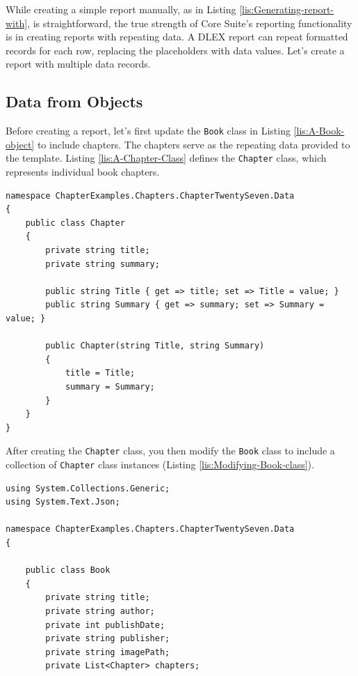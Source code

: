 \documentclass[american,letterpaper]{tufte-book}
\numberwithin{equation}{section}
\numberwithin{figure}{section}
\begin{document}
{{While creating a simple report manually, as in Listing \ref{lis:Generating-report-with},
is straightforward, the true strength of Core Suite's reporting functionality
is in creating reports with repeating data. A DLEX report can repeat
formatted records for each row, replacing the placeholders with data
values. Let's create a report with multiple data records.

\subsection{Data from Objects}

Before creating a report, let's first update the \texttt{Book} class
in Listing \ref{lis:A-Book-object} to include chapters. The chapters
serve as the repeating data provided to the template. Listing \ref{lis:A-Chapter-Class}
defines the \texttt{Chapter} class, which represents individual book
chapters.

\bgroup{}
\begin{lstlisting}[caption={A Chapter Class used with Book class.},label={lis:A-Chapter-Class},basicstyle={\small\ttfamily},breaklines=true]
namespace ChapterExamples.Chapters.ChapterTwentySeven.Data
{
    public class Chapter
    {
        private string title;
        private string summary;

        public string Title { get => title; set => Title = value; }
        public string Summary { get => summary; set => Summary = value; }

        public Chapter(string Title, string Summary)
        {
            title = Title;
            summary = Summary;
        }
    }
}
\end{lstlisting}
\leavevmode\egroup

After creating the \texttt{Chapter} class, you then modify the \texttt{Book}
class to include a collection of \texttt{Chapter} class instances
(Listing \ref{lis:Modifying-Book-class}).

\bgroup{}
\begin{lstlisting}[caption={Modifying Book class to include a collection of Chapter class instances.},label={lis:Modifying-Book-class},basicstyle={\small\ttfamily},breaklines=true]
using System.Collections.Generic;
using System.Text.Json;

namespace ChapterExamples.Chapters.ChapterTwentySeven.Data
{

    public class Book
    {
        private string title;
        private string author;
        private int publishDate;
        private string publisher;
        private string imagePath;
        private List<Chapter> chapters;


\end{lstlisting}}}
\end{document}
